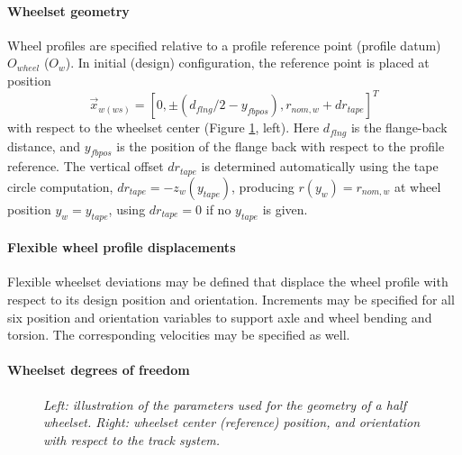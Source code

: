 \documentclass[12pt]{report}
\begin{document}
\paragraph{Wheelset geometry}

Wheel profiles are specified relative to a profile reference point (profile
datum) $O_{wheel}$ ($O_w$). In initial (design) configuration, the
reference point is placed at position 
\[
        \vec{x}_{w(ws)} = [0, \pm (d_{flng}/2-y_{fbpos}), 
                                        r_{nom,w}+dr_{tape}]^T
\]
with respect to the wheelset center (Figure 
\ref{fig:wheel_coord}, left). Here $d_{flng}$ is the flange-back distance,
and $y_{fbpos}$ is the position of the flange back with respect to the
profile reference. The vertical offset $dr_{tape}$ is determined automatically
using the tape circle computation, $dr_{tape}=-z_w(y_{tape})$, producing 
$r(y_w)=r_{nom,w}$ at wheel position $y_w=y_{tape}$, using $dr_{tape}=0$
if no $y_{tape}$ is given.


\paragraph{Flexible wheel profile displacements}

Flexible wheelset deviations may be defined that displace the wheel
profile with respect to its design position and orientation.
Increments may be specified for all six position and orientation variables
to support axle and wheel bending and torsion. The corresponding velocities
may be specified as well.

\paragraph{Wheelset degrees of freedom}

\begin{figure}[bt]
\centering
{}
\hspace{10mm}
\caption{\em Left: illustration of the parameters used for the geometry of
        a half wheelset. Right: wheelset center (reference) position,
        and orientation with respect to the track system.}
\label{fig:wheel_coord}
\end{figure}
\end{document}
